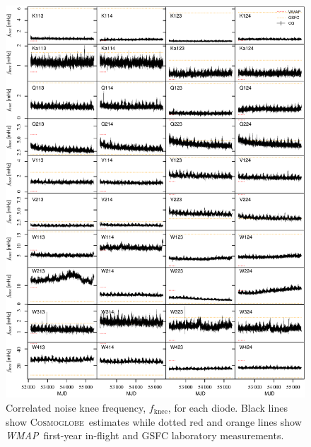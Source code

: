 \documentclass[twocolumn]{../../common/aa}
\def\WMAP{\emph{WMAP}}
\newcommand{\cosmoglobe}{\textsc{Cosmoglobe}}
\begin{document}
\begin{figure}[p]
	\centering
	\includegraphics[width=\textwidth]{figures/instpar_CG_fknee_v1.pdf}
	\caption{Correlated noise knee frequency, $f_{\mathrm{knee}}$, for each diode. Black lines show \cosmoglobe\ estimates while dotted red and orange lines show \WMAP\ first-year in-flight and GSFC laboratory measurements.}

	\label{fig:fknee}
\end{figure}
\end{document}
